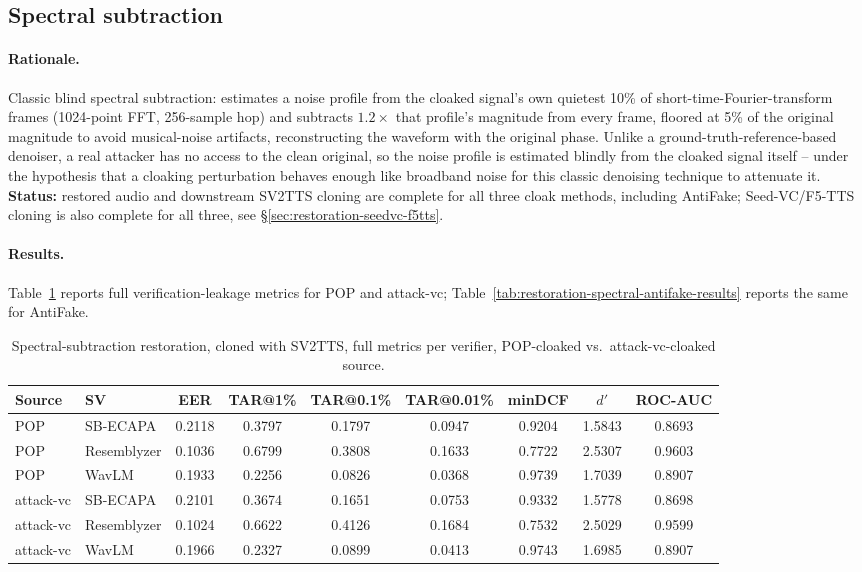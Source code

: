 \documentclass[11pt]{article}
\begin{document}
\subsection{Spectral subtraction}
\label{sec:restoration-spectral}

\paragraph{Rationale.} Classic blind spectral subtraction: estimates a
noise profile from the cloaked signal's own quietest 10\% of
short-time-Fourier-transform frames (1024-point FFT, 256-sample hop)
and subtracts $1.2\times$ that profile's magnitude from every frame,
floored at 5\% of the original magnitude to avoid musical-noise
artifacts, reconstructing the waveform with the original phase. Unlike
a ground-truth-reference-based denoiser, a real attacker has no access
to the clean original, so the noise profile is estimated blindly from
the cloaked signal itself -- under the hypothesis that a cloaking
perturbation behaves enough like broadband noise for this classic
denoising technique to attenuate it. \textbf{Status:} restored audio
and downstream SV2TTS cloning are complete for all three cloak methods,
including AntiFake; Seed-VC/F5-TTS cloning is also complete for all
three, see \S\ref{sec:restoration-seedvc-f5tts}.

\paragraph{Results.} Table~\ref{tab:restoration-spectral-results}
reports full verification-leakage metrics for POP and attack-vc;
Table~\ref{tab:restoration-spectral-antifake-results} reports the same
for AntiFake.

\begin{table}[H]
\centering
\caption{Spectral-subtraction restoration, cloned with SV2TTS, full
metrics per verifier, POP-cloaked vs.\ attack-vc-cloaked source.}
\label{tab:restoration-spectral-results}
\begin{tabular}{llccccccc}
\toprule
Source & SV & EER & TAR@1\% & TAR@0.1\% & TAR@0.01\% & minDCF & $d'$ & ROC-AUC \\
\midrule
POP        & SB-ECAPA    & 0.2118 & 0.3797 & 0.1797 & 0.0947 & 0.9204 & 1.5843 & 0.8693 \\
POP        & Resemblyzer & 0.1036 & 0.6799 & 0.3808 & 0.1633 & 0.7722 & 2.5307 & 0.9603 \\
POP        & WavLM       & 0.1933 & 0.2256 & 0.0826 & 0.0368 & 0.9739 & 1.7039 & 0.8907 \\
\addlinespace
attack-vc  & SB-ECAPA    & 0.2101 & 0.3674 & 0.1651 & 0.0753 & 0.9332 & 1.5778 & 0.8698 \\
attack-vc  & Resemblyzer & 0.1024 & 0.6622 & 0.4126 & 0.1684 & 0.7532 & 2.5029 & 0.9599 \\
attack-vc  & WavLM       & 0.1966 & 0.2327 & 0.0899 & 0.0413 & 0.9743 & 1.6985 & 0.8907 \\
\bottomrule
\end{tabular}
\end{table}
\end{document}
